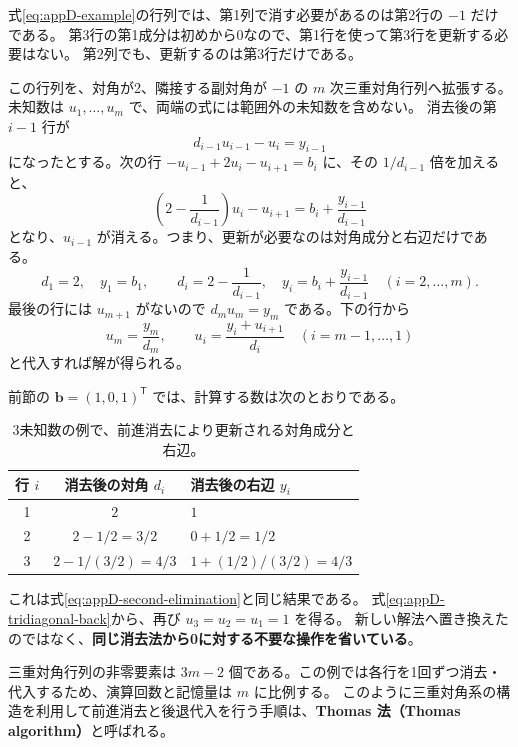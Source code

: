 式\eqref{eq:appD-example}の行列では、第1列で消す必要があるのは第2行の $-1$ だけである。
第3行の第1成分は初めから0なので、第1行を使って第3行を更新する必要はない。
第2列でも、更新するのは第3行だけである。

この行列を、対角が2、隣接する副対角が $-1$ の $m$ 次三重対角行列へ拡張する。
未知数は $u_1,\ldots,u_m$ で、両端の式には範囲外の未知数を含めない。
消去後の第 $i-1$ 行が
\begin{equation*}
 d_{i-1}u_{i-1}-u_i=y_{i-1}
\end{equation*}
になったとする。次の行 $-u_{i-1}+2u_i-u_{i+1}=b_i$ に、その $1/d_{i-1}$ 倍を加えると、
\begin{equation}
 \left(2-\frac{1}{d_{i-1}}\right)u_i-u_{i+1}
 =b_i+\frac{y_{i-1}}{d_{i-1}}
\label{eq:appD-sparse-row}
\end{equation}
となり、$u_{i-1}$ が消える。つまり、更新が必要なのは対角成分と右辺だけである。
\begin{equation}
 d_1=2,\quad y_1=b_1,\qquad
 d_i=2-\frac{1}{d_{i-1}},\quad
 y_i=b_i+\frac{y_{i-1}}{d_{i-1}}\quad(i=2,\ldots,m).
\label{eq:appD-tridiagonal-forward}
\end{equation}
最後の行には $u_{m+1}$ がないので $d_mu_m=y_m$ である。下の行から
\begin{equation}
 u_m=\frac{y_m}{d_m},\qquad
 u_i=\frac{y_i+u_{i+1}}{d_i}\quad(i=m-1,\ldots,1)
\label{eq:appD-tridiagonal-back}
\end{equation}
と代入すれば解が得られる。

前節の $\boldsymbol b=(1,0,1)^{\mathsf T}$ では、計算する数は次のとおりである。
\begin{table}[H]
\centering
\caption{3未知数の例で、前進消去により更新される対角成分と右辺。}
\label{tab:appD-thomas}
\renewcommand{\arraystretch}{1.25}
\begin{tabular}{ccl}
\toprule
行 $i$ & 消去後の対角 $d_i$ & 消去後の右辺 $y_i$ \\
\midrule
1 & $2$ & $1$ \\
2 & $2-1/2=3/2$ & $0+1/2=1/2$ \\
3 & $2-1/(3/2)=4/3$ & $1+(1/2)/(3/2)=4/3$ \\
\bottomrule
\end{tabular}
\end{table}
これは式\eqref{eq:appD-second-elimination}と同じ結果である。
式\eqref{eq:appD-tridiagonal-back}から、再び $u_3=u_2=u_1=1$ を得る。
新しい解法へ置き換えたのではなく、\textbf{同じ消去法から0に対する不要な操作を省いている}。

三重対角行列の非零要素は $3m-2$ 個である。この例では各行を1回ずつ消去・代入するため、演算回数と記憶量は $m$ に比例する。
このように三重対角系の構造を利用して前進消去と後退代入を行う手順は、\textbf{Thomas 法（Thomas algorithm）}と呼ばれる。

